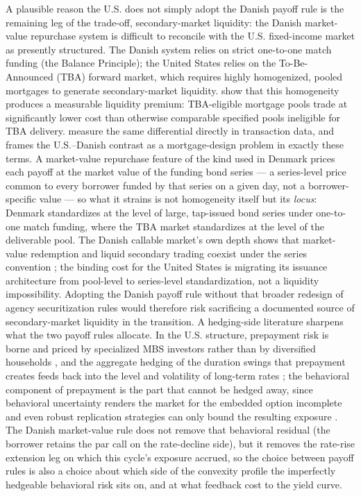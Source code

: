 \documentclass[12pt]{article}
\begin{document}
A plausible reason the U.S. does not simply adopt the Danish payoff rule is the remaining leg of the trade-off, secondary-market liquidity: the Danish market-value repurchase system is difficult to reconcile with the U.S. fixed-income market as presently structured. The Danish system relies on strict one-to-one match funding (the Balance Principle); the United States relies on the To-Be-Announced (TBA) forward market, which requires highly homogenized, pooled mortgages to generate secondary-market liquidity. \citet{vickery2013} show that this homogeneity produces a measurable liquidity premium: TBA-eligible mortgage pools trade at significantly lower cost than otherwise comparable specified pools ineligible for TBA delivery. \citet{gao2017} measure the same differential directly in transaction data, and \citet{campbell2013} frames the U.S.--Danish contrast as a mortgage-design problem in exactly these terms. A market-value repurchase feature of the kind used in Denmark prices each payoff at the market value of the funding bond series --- a series-level price common to every borrower funded by that series on a given day, not a borrower-specific value --- so what it strains is not homogeneity itself but its \emph{locus}: Denmark standardizes at the level of large, tap-issued bond series under one-to-one match funding, where the TBA market standardizes at the level of the deliverable pool. The Danish callable market's own depth shows that market-value redemption and liquid secondary trading coexist under the series convention \citep{berg2018}; the binding cost for the United States is migrating its issuance architecture from pool-level to series-level standardization, not a liquidity impossibility. Adopting the Danish payoff rule without that broader redesign of agency securitization rules would therefore risk sacrificing a documented source of secondary-market liquidity in the transition. A hedging-side literature sharpens what the two payoff rules allocate. In the U.S. structure, prepayment risk is borne and priced by specialized MBS investors rather than by diversified households \citep{gabaix2007}, and the aggregate hedging of the duration swings that prepayment creates feeds back into the level and volatility of long-term rates \citep{malkhozov2016}; the behavioral component of prepayment is the part that cannot be hedged away, since behavioral uncertainty renders the market for the embedded option incomplete and even robust replication strategies can only bound the resulting exposure \citep{perotti2024}. The Danish market-value rule does not remove that behavioral residual (the borrower retains the par call on the rate-decline side), but it removes the rate-rise extension leg on which this cycle's exposure accrued, so the choice between payoff rules is also a choice about which side of the convexity profile the imperfectly hedgeable behavioral risk sits on, and at what feedback cost to the yield curve.
\end{document}
